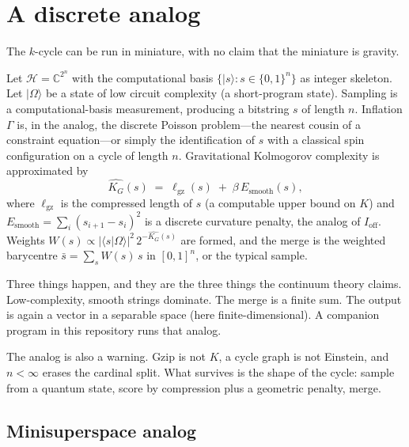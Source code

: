 \documentclass[11pt,a4paper]{article}
\theoremstyle{plain}
\theoremstyle{definition}
\theoremstyle{remark}
\newcommand{\C}{\mathbb{C}}
\newcommand{\Hil}{\mathcal{H}}
\newcommand{\KG}{K_{G}}
\newcommand{\abs}[1]{\lvert#1\rvert}
\newcommand{\ket}[1]{\lvert#1\rangle}
\newcommand{\braket}[2]{\langle#1|#2\rangle}
\begin{document}
\section{A discrete analog}

The $k$-cycle can be run in miniature, with no claim that the miniature is gravity.

Let $\Hil=\C^{2^{n}}$ with the computational basis $\{\ket{s}:s\in\{0,1\}^{n}\}$ as integer skeleton.
Let $\ket{\Omega}$ be a state of low circuit complexity (a short-program state).
Sampling is a computational-basis measurement, producing a bitstring $s$ of length $n$.
Inflation $\Gamma$ is, in the analog, the discrete Poisson problem---the nearest cousin of a constraint equation---or simply the identification of $s$ with a classical spin configuration on a cycle of length $n$.
Gravitational Kolmogorov complexity is approximated by
\begin{equation}
  \widehat{\KG}(s) \;=\; \ell_{\mathrm{gz}}(s) \;+\; \beta\, E_{\mathrm{smooth}}(s),
\end{equation}
where $\ell_{\mathrm{gz}}$ is the compressed length of $s$ (a computable upper bound on $K$) and $E_{\mathrm{smooth}}=\sum_{i}(s_{i+1}-s_{i})^{2}$ is a discrete curvature penalty, the analog of $I_{\mathrm{off}}$.
Weights $W(s)\propto\abs{\braket{s}{\Omega}}^{2}\,2^{-\widehat{\KG}(s)}$ are formed, and the merge is the weighted barycentre $\bar{s}=\sum_{s}W(s)\,s$ in $[0,1]^{n}$, or the typical sample.

Three things happen, and they are the three things the continuum theory claims.
Low-complexity, smooth strings dominate.
The merge is a finite sum.
The output is again a vector in a separable space (here finite-dimensional).
A companion program in this repository runs that analog.

The analog is also a warning.
Gzip is not $K$, a cycle graph is not Einstein, and $n<\infty$ erases the cardinal split.
What survives is the shape of the cycle: sample from a quantum state, score by compression plus a geometric penalty, merge.

\subsection{Minisuperspace analog}
\end{document}
